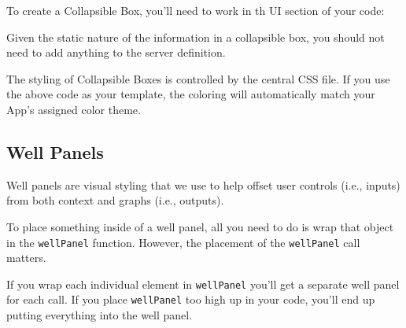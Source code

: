 \documentclass[
]{book}
\newenvironment{Shaded}{\begin{snugshade}}{\end{snugshade}}
\newcommand{\CommentTok}[1]{\textcolor[rgb]{0.56,0.35,0.01}{\textit{#1}}}
\newcommand{\DataTypeTok}[1]{\textcolor[rgb]{0.13,0.29,0.53}{#1}}
\newcommand{\KeywordTok}[1]{\textcolor[rgb]{0.13,0.29,0.53}{\textbf{#1}}}
\newcommand{\NormalTok}[1]{#1}
\newcommand{\OtherTok}[1]{\textcolor[rgb]{0.56,0.35,0.01}{#1}}
\newcommand{\StringTok}[1]{\textcolor[rgb]{0.31,0.60,0.02}{#1}}
\begin{document}
To create a Collapsible Box, you'll need to work in th UI section of your code:

\begin{Shaded}
\end{Shaded}

Given the static nature of the information in a collapsible box, you should not need to add anything to the server definition.

The styling of Collapsible Boxes is controlled by the central CSS file. If you use the above code as your template, the coloring will automatically match your App's assigned color theme.

\hypertarget{well-panels-1}{%
\subsection{Well Panels}\label{well-panels-1}}

Well panels are visual styling that we use to help offset user controls (i.e., inputs) from both context and graphs (i.e., outputs).

To place something inside of a well panel, all you need to do is wrap that object in the \texttt{wellPanel} function. However, the placement of the \texttt{wellPanel} call matters.

If you wrap each individual element in \texttt{wellPanel} you'll get a separate well panel for each call. If you place \texttt{wellPanel} too high up in your code, you'll end up putting everything into the well panel.
\end{document}
